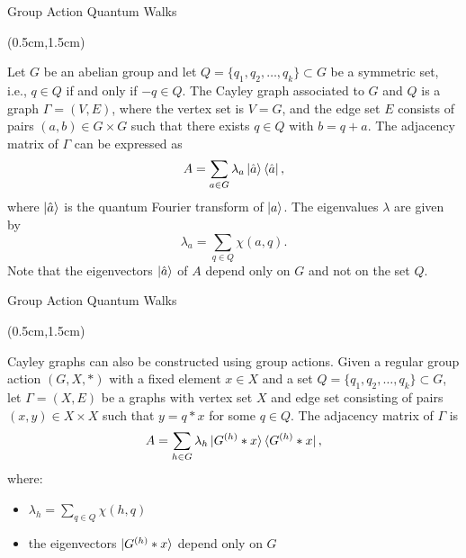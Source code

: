 \documentclass{beamer}
\theoremstyle{definition}
\begin{document}
\begin{frame}{Group Action Quantum Walks}
    
    \begin{textblock*}{12cm}(0.5cm,1.5cm)
            
        Let $G$ be an abelian group and let $Q = \{q_1, q_2, \dots, q_k\} \subset G$ be a symmetric set, i.e., $q \in Q$ if and only if $-q \in Q$. The Cayley graph associated to $G$ and $Q$ is a graph $\Gamma = (V, E)$, where the vertex set is $V = G$, and the edge set $E$ consists of pairs $(a, b) \in G \times G$ such that there exists $q \in Q$ with $b = q + a$. The adjacency matrix of $\Gamma$ can be expressed as
        \[ A = \sum_{a \in G} \lambda_a \ket{\hat{a}} \bra{\hat{a}}, \]
        where $\ket{\hat{a}}$ is the quantum Fourier transform of $\ket{a}$. The eigenvalues $\lambda$ are given by
        \[ \lambda_a = \sum_{q \in Q} \chi(a, q). \]
        Note that the eigenvectors $\ket{\hat{a}}$ of $A$ depend only on $G$ and not on the set $Q$.
    \end{textblock*}


\end{frame}





\begin{frame}{Group Action Quantum Walks}
    
    \begin{textblock*}{12cm}(0.5cm,1.5cm)
               
        Cayley graphs can also be constructed using group actions. Given a regular group action $(G, X, *)$ with a fixed element $x \in X$ and a set  $Q = \{q_1, q_2, \dots, q_k\} \subset G$, let $\Gamma = (X, E)$ be a graphs with vertex set $X$ and edge set consisting of pairs $(x, y) \in X \times X$ such that $y = q * x$ for some $q \in Q$. The adjacency matrix of $\Gamma$ is
        \[ A = \sum_{h \in G} \lambda_h \ket{G^{(h)} * x} \bra{G^{(h)} * x}, \]
        where:
        \begin{itemize}
            \item $\lambda_h = \sum_{q \in Q} \chi(h, q)$
            \item the eigenvectors $\ket{G^{(h)} * x}$ depend only on $G$
        \end{itemize}

    \end{textblock*}

\end{frame}
\end{document}
